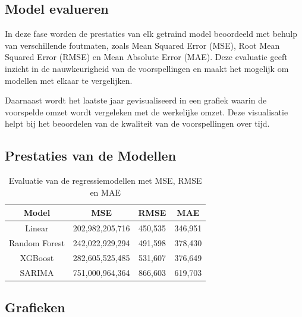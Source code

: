 \subsection{Model evalueren}

In deze fase worden de prestaties van elk getraind model beoordeeld met behulp van verschillende foutmaten, zoals Mean Squared Error (MSE), Root Mean Squared Error (RMSE) en Mean Absolute Error (MAE). Deze evaluatie geeft inzicht in de nauwkeurigheid van de voorspellingen en maakt het mogelijk om modellen met elkaar te vergelijken. 
 
\vspace{1em} 
 
Daarnaast wordt het laatste jaar gevisualiseerd in een grafiek waarin de voorspelde omzet wordt vergeleken met de werkelijke omzet. Deze visualisatie helpt bij het beoordelen van de kwaliteit van de voorspellingen over tijd.

\subsection*{Prestaties van de Modellen}

\begin{table}[H]
    \centering
    \begin{tabular}{|c|c|c|c|}
        \hline
        \textbf{Model}      & \textbf{MSE}       & \textbf{RMSE}       & \textbf{MAE}       \\ \hline
        Linear              & 202,982,205,716    & 450,535             & 346,951            \\ \hline
        Random Forest       & 242,022,929,294    & 491,598             & 378,430            \\ \hline
        XGBoost             & 282,605,525,485    & 531,607             & 376,649            \\ \hline
        SARIMA              & 751,000,964,364    & 866,603             & 619,703       \\ \hline
    \end{tabular}
    \caption{Evaluatie van de regressiemodellen met MSE, RMSE en MAE}
    \label{tab:model_evaluation}
\end{table}


\subsection*{Grafieken}


